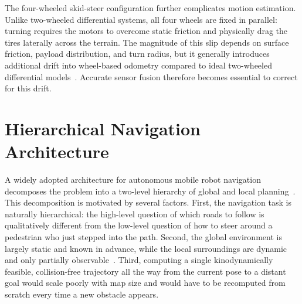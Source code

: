 The four-wheeled skid-steer configuration further complicates motion estimation. Unlike two-wheeled differential systems, all four wheels are fixed in parallel: turning requires the motors to overcome static friction and physically drag the tires laterally across the terrain. The magnitude of this slip depends on surface friction, payload distribution, and turn radius, but it generally introduces additional drift into wheel-based odometry compared to ideal two-wheeled differential models~\cite{mandow2007kinematics}. Accurate sensor fusion therefore becomes essential to correct for this drift.

\section{Hierarchical Navigation Architecture}
\label{sec:hierarchical-navigation}

A widely adopted architecture for autonomous mobile robot navigation decomposes the problem into a two-level hierarchy of global and local planning~\cite{pandey2017review,karur2021survey}. 
This decomposition is motivated by several factors. First, the navigation task is naturally hierarchical: the high-level question of which roads to follow is qualitatively different from the low-level question of how to steer around a pedestrian who just stepped into the path. Second, the global environment is largely static and known in advance, while the local surroundings are dynamic and only partially observable~\cite{karur2021survey}. Third, computing a single kinodynamically feasible, collision-free trajectory all the way from the current pose to a distant goal would scale poorly with map size and would have to be recomputed from scratch every time a new obstacle appears.

